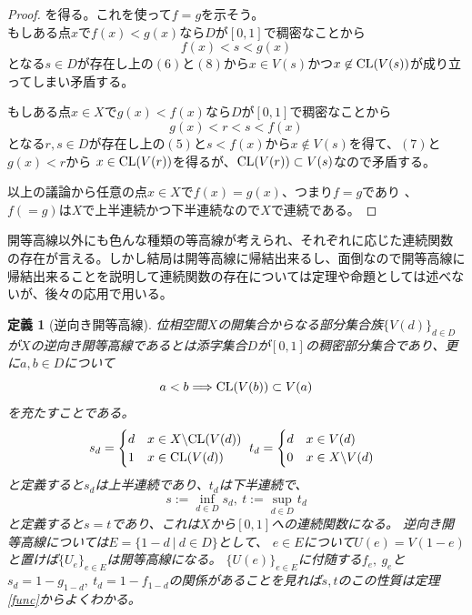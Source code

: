 \documentclass[leqno]{jsarticle}
\newtheorem{df}[thm]{定義}
\newcommand{\To}{\Longrightarrow}
\newcommand{\cl}{\text{{\rm CL}} }
\begin{document}
\begin{proof}
を得る。これを使って$f=g$を示そう。\\ 
もしある点$x$で$f(x)<g(x)$なら$D$が$[0,1]$で稠密なことから
\[
f(x)<s<g(x)
\]
となる$s\in D$が存在し上の$(6)$と$(8)$から$x\in V(s)$かつ$x\not\in \cl(V(s))$が成り立ってしまい矛盾する。\par
もしある点$x\in X$で$g(x)<f(x)$なら$D$が$[0,1]$で稠密なことから
\[
g(x)<r<s<f(x)
\]
となる$r,s\in D$が存在し上の$(5)$と$s<f(x)$から$x\not\in V(s)$を得て、$(7)$と$g(x)<r$から
$x\in \cl(V(r))$を得るが、$\cl(V(r))\subset V(s)$なので矛盾する。\par
以上の議論から任意の点$x\in X$で$f(x)=g(x)$、つまり$f=g$であり
、$f(=g)$は$X$で上半連続かつ下半連続なので$X$で連続である。
\end{proof}


開等高線以外にも色んな種類の等高線が考えられ、それぞれに応じた連続関数の存在が言える。しかし結局は開等高線に帰結出来るし、面倒なので開等高線に帰結出来ることを説明して連続関数の存在については定理や命題としては述べないが、後々の応用で用いる。

\begin{df}[逆向き開等高線]\label{aa}
位相空間$X$の開集合からなる部分集合族$\{V(d)\}_{d\in D}$が$X$の逆向き開等高線であるとは添字集合$D$が$[0,1]$の稠密部分集合であり、更に$a,b\in D$について
\[
a<b\To \cl(V(b))\subset V(a)
\]
を充たすことである。
\[
s_d=\begin{cases}
 d & \text{$x\in X\backslash \cl(V(d))$} \\
 1 & \text{$x\in \cl(V(d))$}
\end{cases}\ 
t_d=\begin{cases}
 d & \text{$x\in V(d)$} \\
 0 & \text{$x\in X\backslash V(d)$}
\end{cases}\ \ 
\]
と定義すると$s_d$は上半連続であり、$t_d$は下半連続で、
\[
s:=\inf_{d\in D}s_d,\ 
t:=\sup_{d\in D}t_d
\]
と定義すると$s=t$であり、これは$X$から$[0,1]$への連続関数になる。
逆向き開等高線については$E=\{1-d\ |\ d\in D\}$として、
$e\in E$について$U(e)=V(1-e)$と置けば$\{U_e\}_{e\in E}$は開等高線になる。
$\{U(e)\}_{e\in E}$に付随する$f_e,\ g_e$と$s_d=1-g_{1-d},\ t_d=1-f_{1-d}$の関係があることを見れば$s,t$のこの性質は定理\ref{func}からよくわかる。

\end{df}
\end{document}
